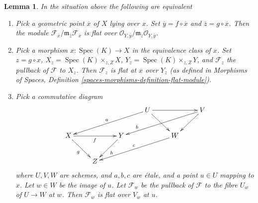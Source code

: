 \documentclass[10pt,a4paper]{amsart}
\theoremstyle{plain}
\newtheorem{lemma}[subsection]{Lemma}
\theoremstyle{definition}
\theoremstyle{remark}
\numberwithin{equation}{subsection}
\def\Spec{\mathop{\mathrm{Spec}}}
\begin{document}
\begin{lemma}
\label{lemma-flat-on-fibres-at-point}
In the situation above the following are equivalent
\begin{enumerate}
\item Pick a geometric point $\overline{x}$ of $X$ lying over $x$.
Set $\overline{y} = f \circ \overline{x}$ and
$\overline{z} = g \circ \overline{x}$. Then the module
$\mathcal{F}_{\overline{x}}/
\mathfrak m_{\overline{z}}\mathcal{F}_{\overline{x}}$
is flat over
$\mathcal{O}_{Y, \overline{y}}/
\mathfrak m_{\overline{z}}\mathcal{O}_{Y, \overline{y}}$.
\item Pick a morphism $x : \Spec(K) \to X$ in the equivalence class of
$x$. Set $z = g \circ x$, $X_z = \Spec(K) \times_{z, Z} X$,
$Y_z = \Spec(K) \times_{z, Z} Y$, and $\mathcal{F}_z$ the pullback
of $\mathcal{F}$ to $X_z$. Then $\mathcal{F}_z$ is flat at $x$ over
$Y_z$ (as defined in Morphisms of Spaces,
Definition \ref{spaces-morphisms-definition-flat-module}).
\item Pick a commutative diagram
$$
\xymatrix{
& & & U \ar[llld]_a \ar[rr] \ar[dr] & & V \ar[llld]_>>>>>>>b \ar[dl] \\
X \ar[rr]_f \ar[dr]_g & & Y \ar[dl]^h &  & W \ar[llld]_c \\
& Z
}
$$
where $U, V, W$ are schemes, and $a, b, c$ are \'etale,
and a point $u \in U$ mapping to $x$. Let $w \in W$ be the image of
$u$. Let $\mathcal{F}_w$ be the pullback of $\mathcal{F}$ to
the fibre $U_w$ of $U \to W$ at $w$. Then $\mathcal{F}_w$
is flat over $V_w$ at $u$.
\end{enumerate}
\end{lemma}
\end{document}
